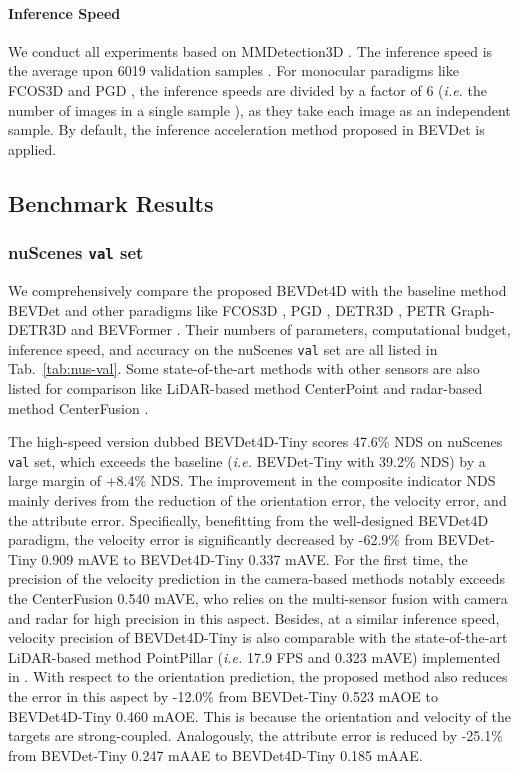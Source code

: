 \documentclass[10pt,twocolumn,letterpaper]{article}
\begin{document}
\paragraph{Inference Speed} We conduct all experiments based on MMDetection3D \cite{mmdet3d2020}. The inference speed is the average upon 6019 validation samples \cite{NS}. For monocular paradigms like FCOS3D \cite{FCOS3D} and PGD \cite{PGD}, the inference speeds are divided by a factor of 6 (\textit{i.e.} the number of images in a single sample \cite{NS}), as they take each image as an independent sample. By default, the inference acceleration method proposed in BEVDet \cite{BEVDet} is applied.







\subsection{Benchmark Results}

\subsubsection{nuScenes \texttt{val} set}
We comprehensively compare the proposed BEVDet4D with the baseline method BEVDet \cite{BEVDet} and other paradigms like FCOS3D \cite{FCOS3D}, PGD \cite{PGD}, DETR3D \cite{DETR3D}, PETR \cite{PETR} Graph-DETR3D \cite{Graph-DETR3D} and BEVFormer \cite{BEVFormer}. Their numbers of parameters, computational budget, inference speed, and accuracy on the nuScenes \texttt{val} set are all listed in Tab.~\ref{tab:nus-val}. Some state-of-the-art methods with other sensors are also listed for comparison like LiDAR-based method CenterPoint \cite{CenterPoint3D} and radar-based method CenterFusion \cite{Centerfusion}.

The high-speed version dubbed BEVDet4D-Tiny scores 47.6\% NDS on nuScenes \texttt{val} set, which exceeds the baseline (\textit{i.e.} BEVDet-Tiny \cite{BEVDet} with 39.2\% NDS) by a large margin of +8.4\% NDS. The improvement in the composite indicator NDS mainly derives from the reduction of the orientation error, the velocity error, and the attribute error. Specifically, benefitting from the well-designed BEVDet4D paradigm, the velocity error is significantly decreased by -62.9\% from BEVDet-Tiny 0.909 mAVE to BEVDet4D-Tiny 0.337 mAVE. For the first time, the precision of the velocity prediction in the camera-based methods notably exceeds the CenterFusion \cite{Centerfusion} 0.540 mAVE, who relies on the multi-sensor fusion with camera and radar for high precision in this aspect. Besides, at a similar inference speed, velocity precision of BEVDet4D-Tiny is also comparable with the state-of-the-art LiDAR-based method PointPillar \cite{PointPillar} (\textit{i.e.} 17.9 FPS and 0.323 mAVE) implemented in \cite{CenterPoint3D}. With respect to the orientation prediction, the proposed method also reduces the error in this aspect by -12.0\% from BEVDet-Tiny 0.523 mAOE to BEVDet4D-Tiny 0.460 mAOE. This is because the orientation and velocity of the targets are strong-coupled. Analogously, the attribute error is reduced by -25.1\% from BEVDet-Tiny 0.247 mAAE to BEVDet4D-Tiny 0.185 mAAE.
\end{document}
